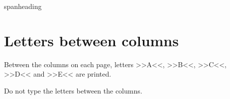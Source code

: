 \documentclass[fontsize=11pt, paper=a4, 
DIV15,
normalheadings,
parskip=half-, 
pointlessnumbers]{scrartcl}
\begin{document}
\begin{sampleImage}{spanheading}
\begin{typeLatin}
  \end{typeLatin}
\end{sampleImage}
\section{Letters between columns}
\label{sec:lett-betw-columns}
Between the columns on each page, letters >>A<<, >>B<<, >>C<<, >>D<< and >>E<< are printed.

\begin{mainrule}
Do not type the letters between the columns.
\end{mainrule}
\end{document}
